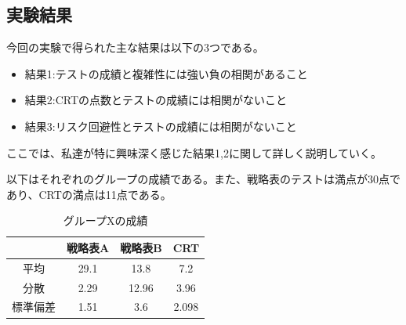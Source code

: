 \subsection{実験結果}

今回の実験で得られた主な結果は以下の3つである。
\begin{itemize}
    \item 結果1:テストの成績と複雑性には強い負の相関があること
    \item 結果2:CRTの点数とテストの成績には相関がないこと
    \item 結果3:リスク回避性とテストの成績には相関がないこと
\end{itemize}
ここでは、私達が特に興味深く感じた結果1,2に関して詳しく説明していく。

以下はそれぞれのグループの成績である。また、戦略表のテストは満点が30点であり、CRTの満点は11点である。
\begin{table}[H]
    \begin{center}
    \caption{グループXの成績}
    \begin{tabular}{|c|c|c|c|}
    \hline
         & 戦略表A & 戦略表B  & CRT   \\ \hline
    平均   & 29.1 & 13.8  & 7.2   \\ \hline
    分散   & 2.29 & 12.96 & 3.96  \\ \hline
    標準偏差 & 1.51 & 3.6   & 2.098 \\ \hline
    \end{tabular}
    \end{center}
\end{table}

